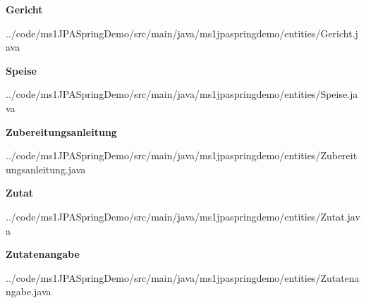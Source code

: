 \textbf{Gericht} \\
\begin{mdframed}[style=codebox]

{../code/ms1JPASpringDemo/src/main/java/ms1jpaspringdemo/entities/Gericht.java}
\end{mdframed}

\textbf{Speise} \\
\begin{mdframed}[style=codebox]

{../code/ms1JPASpringDemo/src/main/java/ms1jpaspringdemo/entities/Speise.java}
\end{mdframed}

\textbf{Zubereitungsanleitung} \\
\begin{mdframed}[style=codebox]

{../code/ms1JPASpringDemo/src/main/java/ms1jpaspringdemo/entities/Zubereitungsanleitung.java}
\end{mdframed}

\textbf{Zutat} \\
\begin{mdframed}[style=codebox]

{../code/ms1JPASpringDemo/src/main/java/ms1jpaspringdemo/entities/Zutat.java}
\end{mdframed}

\textbf{Zutatenangabe} \\
\begin{mdframed}[style=codebox]

{../code/ms1JPASpringDemo/src/main/java/ms1jpaspringdemo/entities/Zutatenangabe.java}
\end{mdframed}
